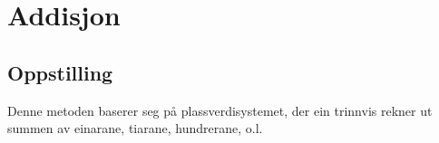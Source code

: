 



\section{Addisjon}

\subsection{Oppstilling}
Denne metoden baserer seg på plassverdisystemet, der ein trinnvis rekner ut summen av einarane, tiarane, hundrerane, o.l.
\begin{center}
	\parbox{0.3\linewidth}{
}\qquad
\parbox{0.3\linewidth}{
}\\[12pt]
\parbox{0.3\linewidth}{
}\qquad
\parbox{0.3\linewidth}{
}
\end{center}
